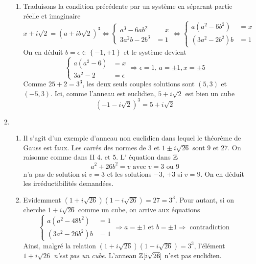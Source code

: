 \begin{enumerate}
\begin{enumerate}
    \item Traduisons la condition précédente par un système en séparant partie réelle et imaginaire
\begin{displaymath}
  x+i\sqrt{2} = (a+ib\sqrt{2})^3
\Leftrightarrow 
\left\lbrace 
\begin{aligned}
  a^3-6ab^2 &= x \\ 3a^2b - 2b^3 &= 1
\end{aligned}
\right. 
\Leftrightarrow 
\left\lbrace 
\begin{aligned}
  a(a^2-6b^2) &= x \\ (3a^2 - 2b^2)b &= 1
\end{aligned}
\right. 
\end{displaymath}
On en déduit $b=\epsilon\in\left\lbrace -1,+1\right\rbrace$ et le système devient
\begin{displaymath}
\left\lbrace 
\begin{aligned}
  a(a^2-6) &= x \\ 3a^2 - 2 &= \epsilon
\end{aligned}
\right.   
\Rightarrow \epsilon = 1, \, a = \pm 1, x = \pm 5
\end{displaymath}
Comme $25 +2 = 3^3$, les deux seuls couples solutions sont $(5,3)$ et $(-5,3)$.\newline
Ici, comme l'anneau est euclidien, $5+i\sqrt{2}$ est bien un cube
\begin{displaymath}
  (-1-i\sqrt{2})^3 = 5 + i\sqrt{2}
\end{displaymath}
  \end{enumerate}
  
  \item 
  \begin{enumerate}
      \item Il s'agit d'un exemple d'anneau non euclidien dans lequel le théorème de Gauss est faux. Les carrés des normes de $3$ et $1 \pm i\sqrt{26}$ sont $9$ et $27$. On raisonne comme dans II 4. et 5. L' équation dans $\mathbb{Z}$
  \begin{displaymath}
    a^2 + 26b^2 = v \text{ avec } v = 3 \text{ ou } 9
  \end{displaymath}
n'a pas de solution si $v=3$ et les solutions $-3$, $+3$ si $v=9$. On en déduit les irréductibilités demandées.

    \item Evidemment $(1+i\sqrt{26})(1-i\sqrt{26})= 27 = 3^3$. Pour autant, si on cherche $1+i\sqrt{26}$ comme un cube, on arrive aux équations
\begin{displaymath}
\left\lbrace 
\begin{aligned}
  a(a^2-48b^2) &= 1 \\ (3a^2 - 26b^2)b &= 1
\end{aligned}
\right. 
  \Rightarrow a=\pm 1 \text{ et } b = \pm 1 \Rightarrow \text{ contradiction }
\end{displaymath}
Ainsi, malgré la relation $(1+i\sqrt{26})(1-i\sqrt{26})= 3^3$, l'élément $1+i\sqrt{26}$ \emph{n'est pas un cube}. L'anneau $\mathbb{Z}[i\sqrt{26}]$ n'est pas euclidien.
  \end{enumerate}

\end{enumerate}
